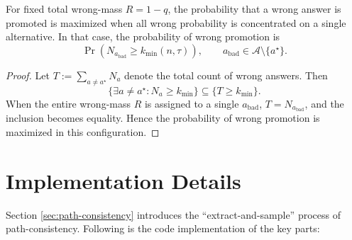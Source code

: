 \begin{corollary}
\label{cor:worst-case}
For fixed total wrong-mass $R = 1-q$, the probability that a wrong answer is promoted is maximized when all wrong probability is concentrated on a single alternative. In that case, the probability of wrong promotion is
\[
\Pr(N_{a_\text{bad}} \ge k_{\min}(n,\tau)), \qquad a_\text{bad} \in \mathcal A \setminus \{a^\star\}.
\]
\end{corollary}

\begin{proof}
Let $T := \sum_{a \neq a^\star} N_a$ denote the total count of wrong answers. Then
\[
\{\exists a\neq a^\star: N_a \ge k_{\min}\} \subseteq \{T \ge k_{\min}\}.
\]
When the entire wrong-mass $R$ is assigned to a single $a_\text{bad}$, $T = N_{a_\text{bad}}$, and the inclusion becomes equality. Hence the probability of wrong promotion is maximized in this configuration.
\end{proof}


\section{Implementation Details}
\label{app:implementation}
Section \ref{sec:path-consistency} introduces the ``extract-and-sample'' process of path-consistency. Following is the code implementation of the key parts:



